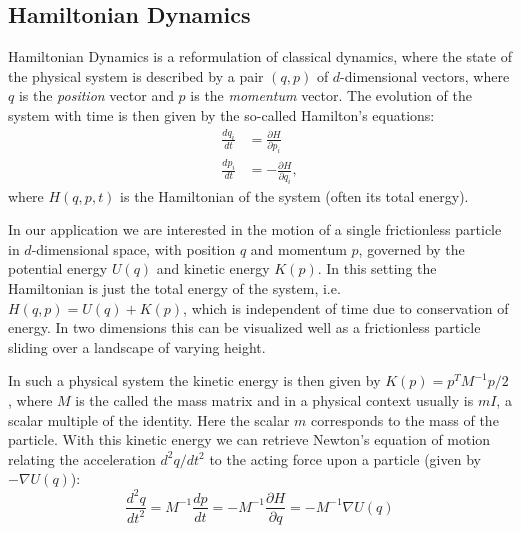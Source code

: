 \documentclass[12pt]{scrartcl}
\begin{document}
\subsection{Hamiltonian Dynamics}

Hamiltonian Dynamics is a reformulation of classical dynamics, where the state of the physical system is described by a pair $(q, p)$ of $d$-dimensional vectors, where $q$ is the \textit{position} vector and $p$ is the \textit{momentum} vector. The evolution of the system with time is then given by the so-called Hamilton's equations:
\begin{equation} \label{eq:HamiltonsEquations}
\begin{split}
\frac{dq_i}{dt} &= \frac{\partial H}{\partial p_i} \\
\frac{dp_i}{dt} &= - \frac{\partial H}{\partial q_i},
\end{split}
\end{equation}
where $H(q, p, t)$ is the Hamiltonian of the system (often its total energy).

In our application we are interested in the motion of a single frictionless particle in $d$-dimensional space, with position $q$ and momentum $p$, governed by the potential energy $U(q)$ and kinetic energy $K(p)$. In this setting the Hamiltonian is just the total energy of the system, i.e. $H(q, p) = U(q) + K(p)$, which is independent of time due to conservation of energy. In two dimensions this can be visualized well as a frictionless particle sliding over a landscape of varying height.

In such a physical system the kinetic energy is then given by $K(p) = p^T M^{-1} p /2$, where $M$ is the called the mass matrix and in a physical context usually is $m I$, a scalar multiple of the identity. Here the scalar $m$ corresponds to the mass of the particle. With this kinetic energy we can retrieve Newton's equation of motion relating the acceleration $d^2q/dt^2$ to the acting force upon a particle (given by $-\nabla U(q)$):
\begin{equation} \label{eq:NewtonsEquation}
\frac{d^2q}{dt^2} = M^{-1} \frac{dp}{dt} = - M^{-1} \frac{\partial H}{\partial q} = - M^{-1} \nabla U(q)
\end{equation}
\end{document}
